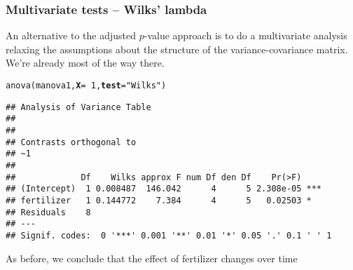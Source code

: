 \documentclass[color=usenames,dvipsnames]{beamer}\usepackage[]{graphicx}\usepackage[]{color}
\makeatletter
\newcommand{\hlnum}[1]{\textcolor[rgb]{0.69,0.494,0}{#1}}%
\newcommand{\hlstr}[1]{\textcolor[rgb]{0.749,0.012,0.012}{#1}}%
\newcommand{\hlopt}[1]{\textcolor[rgb]{0,0,0}{#1}}%
\newcommand{\hlstd}[1]{\textcolor[rgb]{0,0,0}{#1}}%
\newcommand{\hlkwc}[1]{\textcolor[rgb]{0,0,0}{\textbf{#1}}}%
\newcommand{\hlkwd}[1]{\textcolor[rgb]{0.004,0.004,0.506}{#1}}%
\newenvironment{kframe}{%
 \def\at@end@of@kframe{}%
 \ifinner\ifhmode%
  \def\at@end@of@kframe{\end{minipage}}%
  \begin{minipage}{\columnwidth}%
 \fi\fi%
 \def\FrameCommand##1{\hskip\@totalleftmargin \hskip-\fboxsep
 \colorbox{shadecolor}{##1}\hskip-\fboxsep
     \hskip-\linewidth \hskip-\@totalleftmargin \hskip\columnwidth}%
 \MakeFramed {\advance\hsize-\width
   \@totalleftmargin\z@ \linewidth\hsize
   \@setminipage}}%
 {\par\unskip\endMakeFramed%
 \at@end@of@kframe}
\newenvironment{knitrout}{}{} %
\makeatother
\begin{document}
\begin{frame}[fragile]
  \frametitle{Multivariate tests -- Wilks' lambda}
  \small
  {%
    An alternative to the adjusted
    $p$-value approach is to do a multivariate analysis relaxing the
    assumptions about the structure of the variance-covariance
    matrix. We're already most of the way there. \\}
  \pause
  \footnotesize
\begin{knitrout}\footnotesize
{}\color{fgcolor}\begin{kframe}
\begin{alltt}
\hlkwd{anova}\hlstd{(manova1,} \hlkwc{X}\hlstd{=}\hlopt{~}\hlnum{1}\hlstd{,} \hlkwc{test}\hlstd{=}\hlstr{"Wilks"}\hlstd{)}
\end{alltt}
\begin{verbatim}
## Analysis of Variance Table
## 
## 
## Contrasts orthogonal to
## ~1
## 
##             Df    Wilks approx F num Df den Df    Pr(>F)    
## (Intercept)  1 0.008487  146.042      4      5 2.308e-05 ***
## fertilizer   1 0.144772    7.384      4      5   0.02503 *  
## Residuals    8                                              
## ---
## Signif. codes:  0 '***' 0.001 '**' 0.01 '*' 0.05 '.' 0.1 ' ' 1
\end{verbatim}
\end{kframe}
\end{knitrout}
\pause
{%
  As before, we conclude that the effect of fertilizer changes
  over time \\}
\end{frame}
\end{document}
